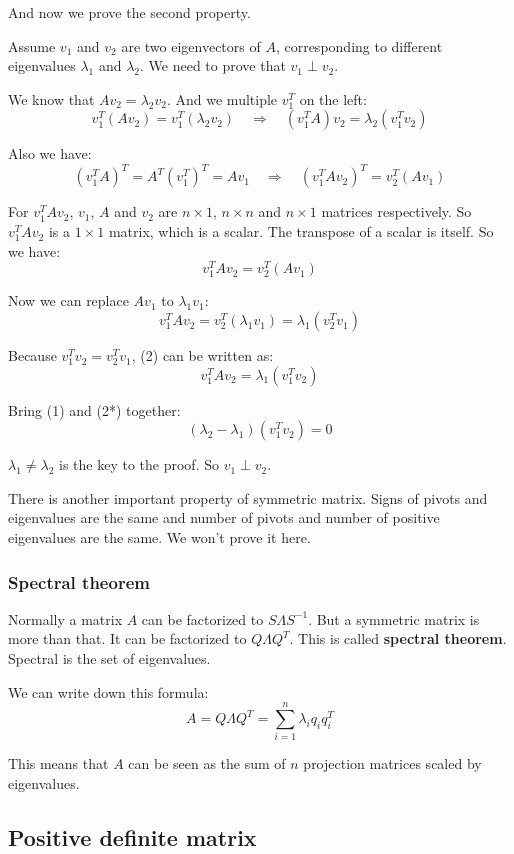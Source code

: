 \documentclass[12pt]{ctexart}
\begin{document}
And now we prove the second property.

Assume $v_1$ and $v_2$ are two eigenvectors of $A$, corresponding to different eigenvalues
$\lambda_1$ and $\lambda_2$. We need to prove that $v_1 \perp v_2$.

We know that $A v_2 = \lambda_2 v_2$. And we multiple $v_1^{T}$ on the left:
\[
  v_1^{T} (A v_2) = v_1^{T} (\lambda_2 v_2) \quad \Rightarrow \quad
  (v_1^T A) v_2 = \lambda_2 (v_1^T v_2) \tag{1}
\]

Also we have:
\[
  (v_1^{T} A)^{T} = A^{T} (v_1^{T})^{T} = A v_1 \quad \Rightarrow \quad
  (v_1^T A v_2)^{T} = v_2^{T} (A v_1)
\]

For $v_1^T A v_2$, $v_1$, $A$ and $v_2$ are $n \times 1$, $n \times n$ and $n \times 1$
matrices respectively. So $v_1^T A v_2$ is a $1 \times 1$ matrix, which is a scalar.
The transpose of a scalar is itself. So we have:
\[
  v_1^T A v_2 = v_2^{T} (A v_1)
\]

Now we can replace $A v_1$ to $\lambda_1 v_1$:
\[
  v_1^T A v_2 = v_2^{T} (\lambda_1 v_1) = \lambda_1 (v_2^{T} v_1) \tag{2}
\]

Because $v_1^{T} v_2 = v_2^{T} v_1$, (2) can be written as:
\[
  v_1^T A v_2 = \lambda_1 (v_1^{T} v_2) \tag{2*}
\]

Bring (1) and (2*) together:
\[
  (\lambda_2 - \lambda_1) (v_1^T v_2) = 0
\]

$\lambda_1 \neq \lambda_2$ is the key to the proof. So $v_1 \perp v_2$.

There is another important property of symmetric matrix. Signs of pivots and eigenvalues
are the same and number of pivots and number of positive eigenvalues are the same. We
won't prove it here.

\subsubsection{\textbf{Spectral theorem}}

Normally a matrix $A$ can be factorized to $S\Lambda S^{-1}$. But a symmetric matrix is
more than that. It can be factorized to $Q\Lambda Q^{T}$. This is called \textbf{spectral
theorem}. Spectral is the set of eigenvalues.

We can write down this formula:
\[
  A = Q\Lambda Q^{T} = \sum_{i=1}^{n} \lambda_i q_i q_i^{T}
\]

This means that $A$ can be seen as the sum of $n$ projection matrices scaled by
eigenvalues.

\subsection{\textbf{Positive definite matrix}}
\end{document}
